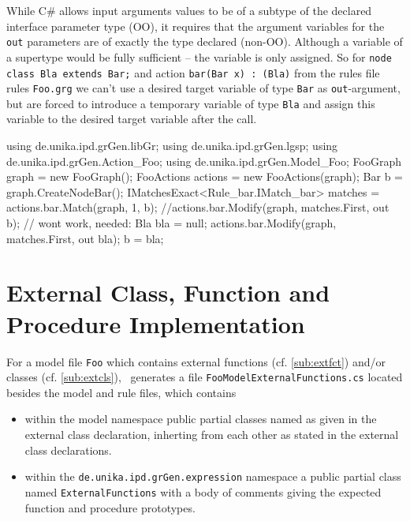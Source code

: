 \begin{warning}
While C\# allows input arguments values to be of a subtype of the declared interface parameter type (OO), 
it requires that the argument variables for the \texttt{out} parameters are of exactly the type declared (non-OO).
Although a variable of a supertype would be fully sufficient -- the variable is only assigned.
So for \texttt{node class Bla extends Bar;} and action \texttt{bar(Bar x) : (Bla)} from the rules file rules \texttt{Foo.grg}
we can't use a desired target variable of type \texttt{Bar} as \texttt{out}-argument,
but are forced to introduce a temporary variable of type \texttt{Bla}
and assign this variable to the desired target variable after the call.
\begin{csharplet}
using de.unika.ipd.grGen.libGr;
using de.unika.ipd.grGen.lgsp;
using de.unika.ipd.grGen.Action_Foo;
using de.unika.ipd.grGen.Model_Foo;
FooGraph graph = new FooGraph();
FooActions actions = new FooActions(graph);
Bar b = graph.CreateNodeBar();
IMatchesExact<Rule_bar.IMatch_bar> matches = actions.bar.Match(graph, 1, b);
//actions.bar.Modify(graph, matches.First, out b); // wont work, needed:
Bla bla = null; 
actions.bar.Modify(graph, matches.First, out bla);
b = bla;
\end{csharplet}
\end{warning}


\section{External Class, Function and Procedure Implementation}\label{sub:extclsfctimpl}

For a model file \texttt{Foo} which contains external functions (cf. \ref{sub:extfct}) and/or classes (cf. \ref{sub:extcls}), \GrG~generates a file \texttt{FooModelExternalFunctions.cs} located besides the model and rule files, which contains
\begin{itemize}
	\item within the model namespace public partial classes named as given in the external class declaration,
inherting from each other as stated in the external class declarations.
	\item within the \texttt{de.unika.ipd.grGen.expression} namespace a public partial class named \texttt{ExternalFunctions} with a body of comments giving the expected function and procedure prototypes.
\end{itemize}

